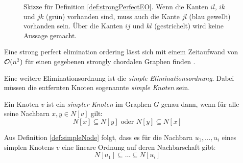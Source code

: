 \begin{figure}[htb]
\centering
\caption[Skizze für Definition \ref{def:strongPerfectEO}]
    {Skizze für Definition \ref{def:strongPerfectEO}.  Wenn die Kanten $il$, $ik$ und $jk$ (grün) vorhanden sind, muss auch die Kante $jl$ (blau gewellt) vorhanden sein. Über die Kanten $ij$ und $kl$ (gestrichelt) wird keine Aussage gemacht.}
\label{pic:SkizzeBeweisStrPerfEO}
\end{figure}

Eine strong perfect elimination ordering lässt sich mit einem Zeitaufwand von $\mathcal{O}(n^3)$ für einen gegebenen strongly chordalen Graphen finden \cite{Anstee1984}.

Eine weitere Eliminationsordnung ist die \emph{simple Eliminationsordnung}. Dabei müssen die entfernten Knoten sogenannte \emph{simple Knoten} sein.

\begin{mydef}\label{def:simpleNode}
    Ein Knoten $v$ ist ein \emph{simpler Knoten} im Graphen $G$ genau dann, wenn für alle seine Nachbarn $x,y\in N[v]$ gilt:
    \[ N[x] \subseteq N[y] \text{ oder } N[y] \subseteq N[x] \]
\end{mydef}

Aus Definition \ref{def:simpleNode} folgt, dass es für die Nachbarn $u_1,\ldots,u_i$ eines simplen Knotens $v$ eine lineare Ordnung auf deren Nachbarschaft gibt: \[ N[u_1] \subseteq \ldots \subseteq N[u_i] \]

